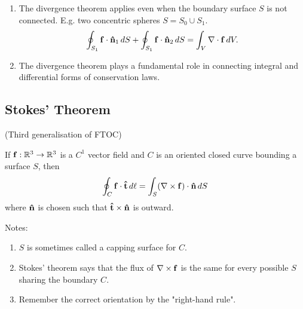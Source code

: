 \documentclass[10pt, a4paper]{article}
\begin{document}
\begin{remark}
    \begin{enumerate}[label = (\arabic*)]
        \item The divergence theorem applies even when the boundary surface $S$ is not connected.
        E.g. two concentric spheres $S = S_0 \cup S_1$.
        \[
        \oint_{S_1}\mathbf{f}\cdot\mathbf{\hat{n}}_1\,dS + \oint_{S_1}\mathbf{f}\cdot\mathbf{\hat{n}}_2\,dS = \int_{V}\mathbf{\nabla}\cdot\mathbf{f}\,dV.
        \]

        \item The divergence theorem plays a fundamental role in connecting integral and differential forms of conservation laws.
    \end{enumerate}
\end{remark}

\subsection{Stokes' Theorem}
(Third generalisation of FTOC)

\begin{theorem}\label{mathmethII:thm:stokesthm}
    If $\mathbf{f} : \mathbb{R} ^ 3 \to \mathbb{R} ^ 3$ is a $C ^ {1}$ vector field and $C$ is an oriented closed curve bounding a surface $S$,
    then
    \[
    \oint_{C}\mathbf{f}\cdot\mathbf{\hat{t}}\,d\ell = \int_{S}(\mathbf{\nabla} \times \mathbf{f})\cdot\mathbf{\hat{n}}\,dS
    \]
    where $\mathbf{\hat{n}}$ is chosen such that $\mathbf{\hat{t}} \times \mathbf{\hat{n}}$ is outward.
\end{theorem}

Notes:
\begin{enumerate}[label = (\arabic*)]
    \item $S$ is sometimes called a capping surface for $C$.

    \item Stokes' theorem says that the flux of $\mathbf{\nabla} \times \mathbf{f}$ is the same for every possible $S$ sharing the boundary $C$.

    \item Remember the correct orientation by the
    "right-hand rule".
\end{enumerate}
\end{document}
